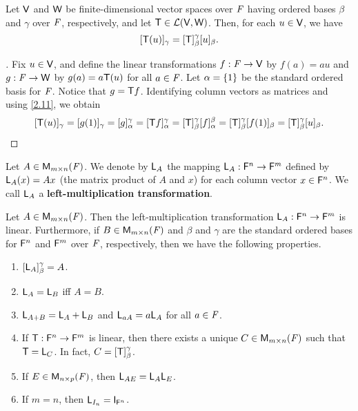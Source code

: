 \begin{thm}\label{2.14}
	Let \(\mathsf{V}\) and \(\mathsf{W}\) be finite-dimensional vector spaces over \(\mathit{F}\) having ordered bases \(\beta\) and \(\gamma\) over \(\mathit{F}\), respectively, and let \(\mathsf{T} \in \mathcal{L}(\mathsf{V}, \mathsf{W})\).
	Then, for each \(u \in \mathsf{V}\), we have
	\[
		[\mathsf{T}(u)]_{\gamma} = [\mathsf{T}]_{\beta}^{\gamma} [u]_{\beta}.
	\]
\end{thm}

\begin{proof}[]
	Fix \(u \in \mathsf{V}\), and define the linear transformations \(f : \mathit{F} \to \mathsf{V}\) by \(f(a) = au\) and \(g : \mathit{F} \to \mathsf{W}\) by \(g(a) = a \mathsf{T}(u)\) for all \(a \in \mathit{F}\).
	Let \(\alpha = \left\lbrace1\right\rbrace\) be the standard ordered basis for \(\mathit{F}\).
	Notice that \(g = \mathsf{T} f\).
	Identifying column vectors as matrices and using \cref{2.11}, we obtain
	\[
		[\mathsf{T}(u)]_{\gamma} = [g(1)]_{\gamma} = [g]_{\alpha}^{\gamma} = [\mathsf{T} f]_{\alpha}^{\gamma} = [\mathsf{T}]_{\beta}^{\gamma} [f]_{\alpha}^{\beta} = [\mathsf{T}]_{\beta}^{\gamma} [f(1)]_{\beta} = [\mathsf{T}]_{\beta}^{\gamma} [u]_{\beta}.
	\]
\end{proof}

\begin{defn}\label{2.3.8}
	Let \(A \in \ms[m][n][\F]\).
	We denote by \(\mathsf{L}_A\) the mapping \(\mathsf{L}_A : \mathsf{F}^n \to \mathsf{F}^m\) defined by \(\mathsf{L}_A(x) = Ax\) (the matrix product of \(A\) and \(x\)) for each column vector \(x \in \mathsf{F}^n\).
	We call \(\mathsf{L}_A\) a \textbf{left-multiplication transformation}.
\end{defn}

\begin{thm}\label{2.15}
	Let \(A \in \MS\).
	Then the left-multiplication transformation \(\mathsf{L}_A : \mathsf{F}^n \to \mathsf{F}^m\) is linear.
	Furthermore, if \(B \in \MS\) and \(\beta\) and \(\gamma\) are the standard ordered bases for \(\mathsf{F}^n\) and \(\mathsf{F}^m\) over \(\mathit{F}\), respectively, then we have the following properties.
	\begin{enumerate}
		\item \([\mathsf{L}_A]_{\beta}^{\gamma} = A\).
		\item \(\mathsf{L}_A = \mathsf{L}_B\) iff \(A = B\).
		\item \(\mathsf{L}_{A + B} = \mathsf{L}_A + \mathsf{L}_B\) and \(\mathsf{L}_{aA} = a \mathsf{L}_A\) for all \(a \in \mathit{F}\).
		\item If \(\mathsf{T} : \mathsf{F}^n \to \mathsf{F}^m\) is linear, then there exists a unique \(C \in \MS\) such that \(\mathsf{T} = \mathsf{L}_C\).
		      In fact, \(C = [\mathsf{T}]_{\beta}^{\gamma}\).
		\item If \(E \in \ms[n][p][\F]\), then \(\mathsf{L}_{AE} = \mathsf{L}_A \mathsf{L}_E\).
		\item If \(m = n\), then \(\L_{I_n} = \IT[\vs{F}^n]\).
	\end{enumerate}
\end{thm}

